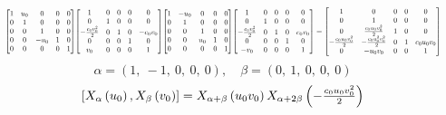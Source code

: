 \documentclass[11pt]{article}
\theoremstyle{definition}
\begin{document}
\[
\scaletoalign{\textwidth}{{\left[\begin{matrix}1 & u_{0} & 0 & 0 & 0\\0 & 1 & 0 & 0 & 0\\0 & 0 & 1 & 0 & 0\\0 & 0 & - u_{0} & 1 & 0\\0 & 0 & 0 & 0 & 1\end{matrix}\right]} {\left[\begin{matrix}1 & 0 & 0 & 0 & 0\\0 & 1 & 0 & 0 & 0\\- \frac{c_{0} v_{0}^{2}}{2} & 0 & 1 & 0 & - c_{0} v_{0}\\0 & 0 & 0 & 1 & 0\\v_{0} & 0 & 0 & 0 & 1\end{matrix}\right]} {\left[\begin{matrix}1 & - u_{0} & 0 & 0 & 0\\0 & 1 & 0 & 0 & 0\\0 & 0 & 1 & 0 & 0\\0 & 0 & u_{0} & 1 & 0\\0 & 0 & 0 & 0 & 1\end{matrix}\right]} {\left[\begin{matrix}1 & 0 & 0 & 0 & 0\\0 & 1 & 0 & 0 & 0\\- \frac{c_{0} v_{0}^{2}}{2} & 0 & 1 & 0 & c_{0} v_{0}\\0 & 0 & 0 & 1 & 0\\- v_{0} & 0 & 0 & 0 & 1\end{matrix}\right]} = {\left[\begin{matrix}1 & 0 & 0 & 0 & 0\\0 & 1 & 0 & 0 & 0\\0 & \frac{c_{0} u_{0} v_{0}^{2}}{2} & 1 & 0 & 0\\- \frac{c_{0} u_{0} v_{0}^{2}}{2} & - \frac{c_{0} u_{0}^{2} v_{0}^{2}}{2} & 0 & 1 & c_{0} u_{0} v_{0}\\0 & - u_{0} v_{0} & 0 & 0 & 1\end{matrix}\right]}}
\]
\[
\alpha = \left( 1, \  -1, \  0, \  0, \  0\right), \quad \beta = \left( 0, \  1, \  0, \  0, \  0\right)
\]
\[
\scaletoalign{\textwidth}{\left[ X_{\alpha}\left(u_{0}\right), X_{\beta}\left(v_{0}\right) \right] = X_{\alpha + \beta}\left(u_{0} v_{0}\right) X_{\alpha + 2\beta}\left(- \frac{c_{0} u_{0} v_{0}^{2}}{2}\right)}
\]
\end{document}
